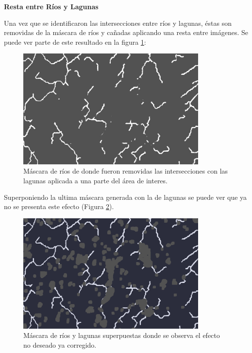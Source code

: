 \documentclass[10pt,a4paper, twoside]{report}
\begin{document}

\textbf{Resta entre Ríos y Lagunas}
\label{restarioscaniadas}

Una vez que se identificaron las intersecciones entre ríos y lagunas, éstas son removidas de la máscara de ríos y cañadas aplicando una resta entre imágenes. Se puede ver parte de este resultado en la figura \ref{riversSinLagunas}:

\begin{figure}[H]
   \centering      
   \includegraphics[width=0.85\textwidth]{imagenes/riversSinLagunas.jpg}
 \caption{Máscara de ríos de donde fueron removidas las intersecciones con las lagunas aplicada a una parte del área de interes.}
 \label{riversSinLagunas}
\end{figure}

Superponiendo la ultima máscara generada con la de lagunas se puede ver que ya no se presenta este efecto (Figura \ref{riversYLagunas}).

\begin{figure}[H]
   \centering      
   \includegraphics[width=0.85\textwidth]{imagenes/riversYLagunas.jpg}
 \caption{Máscara de ríos y lagunas superpuestas donde se observa el efecto no deseado ya corregido.}
 \label{riversYLagunas}
\end{figure}
\end{document}
